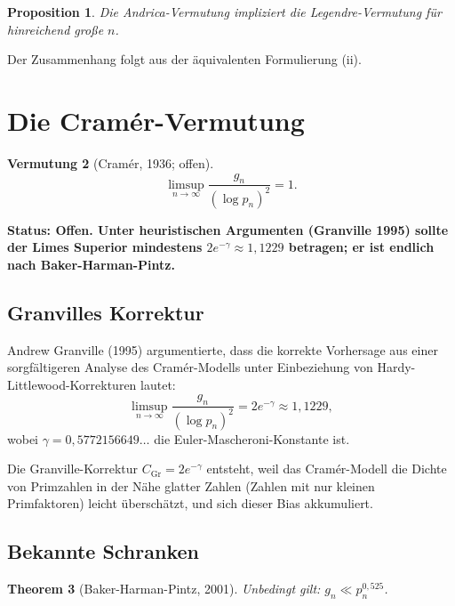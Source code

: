 \documentclass[12pt,a4paper]{amsart}
\newtheorem{theorem}{Theorem}[section]
\newtheorem{proposition}[theorem]{Proposition}
\newtheorem{vermutung}[theorem]{Vermutung}
\theoremstyle{definition}
\begin{document}
\begin{proposition}
Die Andrica-Vermutung impliziert die Legendre-Vermutung f\"{u}r hinreichend gro\ss{}e
$n$.
\end{proposition}

Der Zusammenhang folgt aus der \"{a}quivalenten Formulierung (ii).

\section{Die Cram\'{e}r-Vermutung}

\begin{vermutung}[Cram\'{e}r, 1936; offen]
\label{verm:cramer}
\[
  \limsup_{n \to \infty} \frac{g_n}{(\log p_n)^2} = 1.
\]
\end{vermutung}

\textbf{Status: Offen. Unter heuristischen Argumenten (Granville 1995) sollte
der Limes Superior mindestens $2e^{-\gamma} \approx 1{,}1229$ betragen; er ist
endlich nach Baker-Harman-Pintz.}

\subsection{Granvilles Korrektur}

Andrew Granville (1995) argumentierte, dass die korrekte Vorhersage aus einer
sorgf\"{a}ltigeren Analyse des Cram\'{e}r-Modells unter Einbeziehung von
Hardy-Littlewood-Korrekturen lautet:
\[
  \limsup_{n \to \infty} \frac{g_n}{(\log p_n)^2} = 2e^{-\gamma} \approx 1{,}1229,
\]
wobei $\gamma = 0{,}5772156649\ldots$ die Euler-Mascheroni-Konstante ist.

Die Granville-Korrektur $C_{\text{Gr}} = 2e^{-\gamma}$ entsteht, weil das
Cram\'{e}r-Modell die Dichte von Primzahlen in der N\"{a}he glatter Zahlen (Zahlen
mit nur kleinen Primfaktoren) leicht \"{u}bersch\"{a}tzt, und sich dieser Bias
akkumuliert.

\subsection{Bekannte Schranken}

\begin{theorem}[Baker-Harman-Pintz, 2001]
Unbedingt gilt: $g_n \ll p_n^{0{,}525}$.
\end{theorem}
\end{document}
